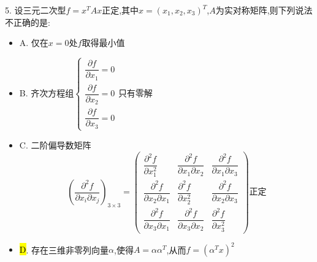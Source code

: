 5. 设三元二次型$f=x^{T}Ax$正定,其中$x=(x_{1},x_{2},x_{3})^{T}$,$A$为实对称矩阵,则下列说法不正确的是:  
\begin{itemize}
	\item A. 仅在$x=0$处$f$取得最小值
	\item B. 齐次方程组$\left\lbrace
	\begin{array}{l}
		\dfrac{\partial f}{\partial x_{1}}=0\\
		\dfrac{\partial f}{\partial x_{2}}=0\\
		\dfrac{\partial f}{\partial x_{3}}=0
	\end{array}
	\right. $只有零解
	\item C. 二阶偏导数矩阵
	$$\left( \dfrac{\partial^2 f}{\partial x_{i}\partial x_{j}}\right)_{3\times 3}=\left( \begin{matrix}
		\dfrac{\partial^2 f}{\partial x_{1}^2}&\dfrac{\partial^2 f}{\partial x_{1}\partial x_{2}}&\dfrac{\partial^2 f}{\partial x_{1}\partial x_{3}}\\
		\dfrac{\partial^2 f}{\partial x_{2}\partial x_{1}}&\dfrac{\partial^2 f}{\partial x_{2}^2}&\dfrac{\partial^2 f}{\partial x_{2}\partial x_{3}}\\
		\dfrac{\partial^2 f}{\partial x_{3}\partial x_{1}}&\dfrac{\partial^2 f}{\partial x_{3}\partial x_{2}}&\dfrac{\partial^2 f}{\partial x_{3}^2}
	\end{matrix}\right) \text{正定}$$
	\item \hl{D}. 存在三维非零列向量$\alpha$,使得$A=\alpha\alpha^{T}$,从而$f=(\alpha^{T}x)^2$
\end{itemize}
